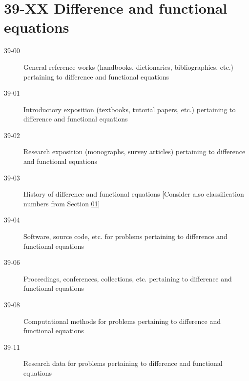 \documentclass[letterpaper]{article}
\begin{document}
\section*{39-XX Difference and functional equations }\label{39-XX}
\begin{description}
\item [39-00]\label{39-00} General reference works (handbooks, dictionaries, bibliographies, etc.) pertaining to difference and functional equations
\item [39-01]\label{39-01} Introductory exposition (textbooks, tutorial papers, etc.) pertaining to difference and functional equations
\item [39-02]\label{39-02} Research exposition (monographs, survey articles) pertaining to difference and functional equations
\item [39-03]\label{39-03} History of difference and functional equations [Consider also classification numbers from Section \hyperref[01-XX]{01}]
\item [39-04]\label{39-04} Software, source code, etc. for problems pertaining to difference and functional equations
\item [39-06]\label{39-06} Proceedings, conferences, collections, etc. pertaining to difference and functional equations
\item [39-08]\label{39-08} Computational methods for problems pertaining to difference and functional equations
\item [39-11]\label{39-11} Research data for problems pertaining to difference and functional equations
\end{description}
\end{document}

